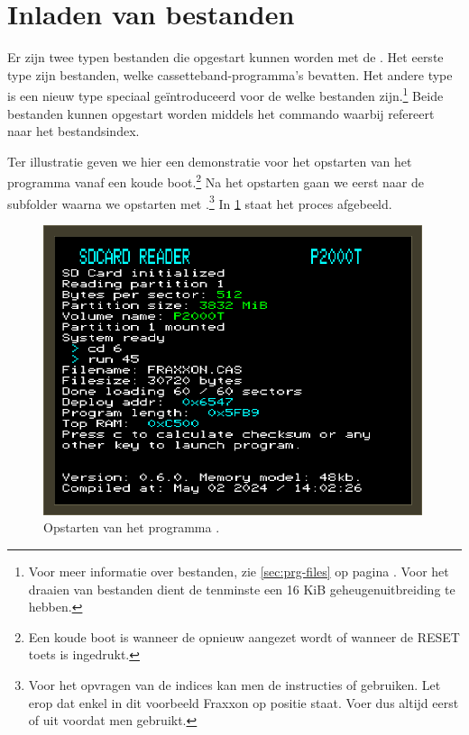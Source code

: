 %
%
%
\section{Inladen van bestanden}
\label{sec:loading}


Er zijn twee typen bestanden die opgestart kunnen worden met de \product. Het eerste type zijn \cas bestanden, welke cassetteband-programma's bevatten. Het andere type is een nieuw type speciaal geïntroduceerd voor de \product welke \prg bestanden zijn.\footnote{Voor meer informatie over \prg bestanden, zie \cref{sec:prg-files} op pagina \pageref{sec:prg-files}. Voor het draaien van \prg bestanden dient de \pc tenminste een 16 KiB geheugenuitbreiding te hebben.} Beide bestanden kunnen opgestart worden middels het  commando waarbij  refereert naar het bestandsindex.

Ter illustratie geven we hier een demonstratie voor het opstarten van het programma  vanaf een koude boot.\footnote{Een koude boot is wanneer de \pc opnieuw aangezet wordt of wanneer de RESET toets is ingedrukt.} Na het opstarten gaan we eerst naar de subfolder  waarna we  opstarten met .\footnote{Voor het opvragen van de indices kan men de instructies  of  gebruiken. Let erop dat enkel in dit voorbeeld Fraxxon op positie  staat. Voer dus altijd eerst  of  uit voordat men  gebruikt.} In \cref{fig:screenshot-run-fraxon} staat het proces afgebeeld.

\begin{figure}[h!]
    \centering
    \includegraphics[width=0.99\textwidth]{img/run-fraxxon.png}
    \caption{Opstarten van het programma .}
    \label{fig:screenshot-run-fraxon}
\end{figure}

